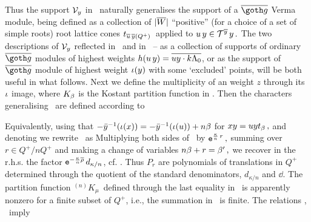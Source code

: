 Thus the support ${\cal V}_y$ in \vsupp\ naturally generalises the
support of a $\bgo$ Verma module,  being defined as a collection
of $|\overline W|$ ``positive'' (for a choice of a set of simple roots)
root lattice cones $t_{\overline{u}\,\overline{y}(Q^+)}\,$ applied to $ u
\,y\in {\cal T}^{\overline{y}}\,y\,.$ The two descriptions of ${\cal V}_y$ 
reflected in \vsuppa\  and in \vsupp\ -- as a collection of
supports of ordinary $\bgo$ modules of highest weights $h(u\,y
)=\overline{u y \cdot k\Lambda_0}$, or as  the support of $\bgo$
module of highest weight $\iota(y)$ with  some `excluded' points,
will be both useful in what follows.  Next we define the
multiplicity of an weight $z$ through its $\iota$ image,
%
\eqn{}
%
where $K_{\beta}$ is the Kostant partition function in \cch.
Then the characters generalising \cch\ are defined according to

%
\eqn{}
%
Equivalently, using that
$-\bar y^{-1}(\iota(x))=-\bar y^{-1}(\iota(u))+n\beta$ for $xy=u y
t_{\beta}\,,$ and denoting
%
\eqn{}
%
we rewrite \vch\ as
%
\eqn{}
%
Multiplying both sides of \pk\ by  ${\tt e}^{ {\kappa\over n}
\,r}\,,$ summing over $r\in Q^+/n Q^+$ and making a change of
variables $n\beta+r=\beta'\,,$  we recover in the r.h.s.  the factor
${\tt e}^{- {\kappa\over n} \overline{\rho}}\,d_{\kappa/n}$, cf. \cch.  Thus
$P_r$ are
polynomials of translations in 
$Q^+$  
determined through 
the quotient 
of the standard denominators, $d_{\kappa/n}$ and
$\dd$.
%
\eqn{}
%
%
\eqn{}
%
 The partition function  ${}^{(n)}K_{\mu}\,$ defined through the
last equality in \pI\ is apparently nonzero for a finite subset
of $Q^+$, i.e., the summation in \pII\ is finite.  The relations
\pk, \pII\ imply
%
\eqn{}
%  


